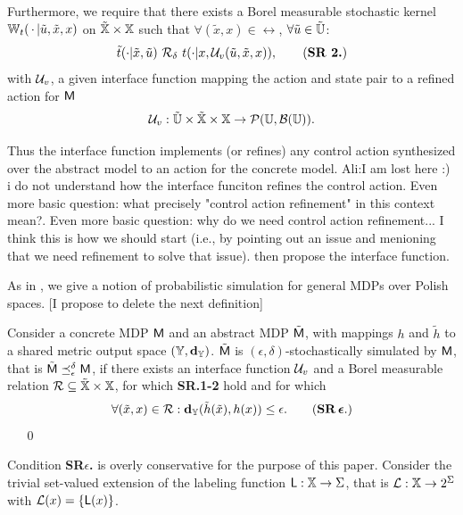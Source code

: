 \documentclass{ifacconf}
\newcommand{\red}[1]{{\color{red} #1}}
\renewcommand{\axx}[1]{{\color{orange} Ali:#1}}
\begin{document}
Furthermore, we require that there exists a Borel measurable stochastic kernel $\mathbb{W}_{t}(\,\cdot\,{\mid} \tilde u,\tilde x,x)$ on $\tilde {{\mathbb{X}}}\times{\mathbb{X}}$ such that $\forall (\tilde x,x)\in \rel$, $\forall \tilde u\in\tilde {{\mathbb{U}}}$:
\begin{equation}\tilde \tr(\cdot| \tilde x, \tilde u)\ \bar \rel_\delta \  \tr(\cdot| x, \InF(\tilde u,\tilde x,x)),\tag{\textbf{SR 2.}}\end{equation} with $\mathcal{U}_{v}$, a given interface function mapping the action and state pair to a refined action for $\mathsf{M}$
\begin{align*}\mathcal{U}_{v}: \tilde {{\mathbb{U}}}\times \tilde {{\mathbb{X}}}\times{\mathbb{X}} \rightarrow \mathcal{P}({\mathbb{U}},\mathcal B({\mathbb{U}})). \end{align*}

Thus the interface function implements (or refines) any control action synthesized over the abstract model to an action for the concrete model.
\axx{I am lost here :) i do not understand how the interface funciton refines the control action. Even more basic question: what precisely "control action refinement" in this context mean?. Even more basic question: why do we need control action refinement... I think this is how we should start (i.e., by pointing out an issue and menioning that we need refinement to solve that issue). then propose the interface function.}


As in \citep{haesaert2017verification},  we give a notion of probabilistic simulation for  general MDPs over Polish spaces.
%
\red{[I propose to delete the next definition]}
\begin{definition}\label{def:apbsim}
Consider a concrete MDP $\mathsf{M}$ and an abstract  MDP $\tilde{\mathsf{M}}$, with mappings $h$ and  $\tilde h$  to a shared {metric} output space  $({\mathbb{Y}},\mathbf{d}_{\mathbb{Y}})$.   
	$\tilde{\mathsf{M}}$ is $(\epsilon,\delta)$-stochastically simulated by $\mathsf{M}$, that is $\tilde{\mathsf{M}}\preceq^{\delta}_\epsilon\mathsf{M}$,  if there exists an interface function $\mathcal{U}_{v}$ and
	a Borel measurable relation $\mathcal{R}\subseteq \tilde {{\mathbb{X}}}\times {\mathbb{X}}$, for which \textbf{SR.1-2} hold and for which 
	\begin{equation}
		\forall (\tilde x,x)\in \rel:\mathbf{d}_\Y(\tilde h(\tilde x),h(x))  \leq \epsilon.\tag{\textbf{SR\,$\boldsymbol{\epsilon}$}.}
	\end{equation} 
\mbox{ }	\hfill\mbox{ }\qed
\end{definition}
Condition \textbf{SR$\epsilon$.} is overly conservative for the purpose of this paper. 
Consider the trivial set-valued extension of  the labeling function $\mathsf{L}:{\mathbb{X}}\rightarrow\Sigma$, that is  $\mathcal{L}:{\mathbb{X}}\rightarrow2^\Sigma$ with
 $\mathcal{L}(x)=\{\mathsf{L}(x)\}$.
\end{document}
